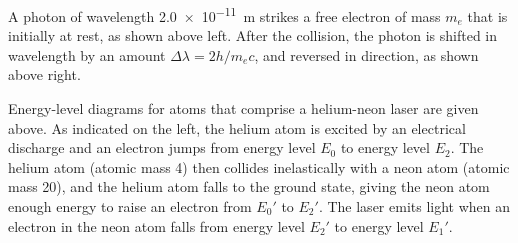 \documentclass{../../../oss-ap12ibhl}
\begin{document}
\begin{questions}
  \question A photon of wavelength \SI{2.0e-11}{\metre} strikes a free electron
  of mass $m_e$ that is initially at rest, as shown above left. After the
  collision, the photon is shifted in wavelength by an amount
  $\Delta\lambda=2h/m_ec$, and reversed in direction, as shown above right.
  \newpage
  
  \question Energy-level diagrams for atoms that comprise a helium-neon laser
  are given above. As indicated on the left, the helium atom is excited by an
  electrical discharge and an electron jumps from energy level $E_0$ to energy
  level $E_2$. The helium atom (atomic mass 4) then collides inelastically with
  a neon atom (atomic mass 20), and the helium atom falls to the ground state,
  giving the neon atom enough energy to raise an electron from $E_0'$ to $E_2'$.
  The laser emits light when an electron in the neon atom falls from energy
  level $E_2'$ to energy level $E_1'$.
\end{questions}
\end{document}
